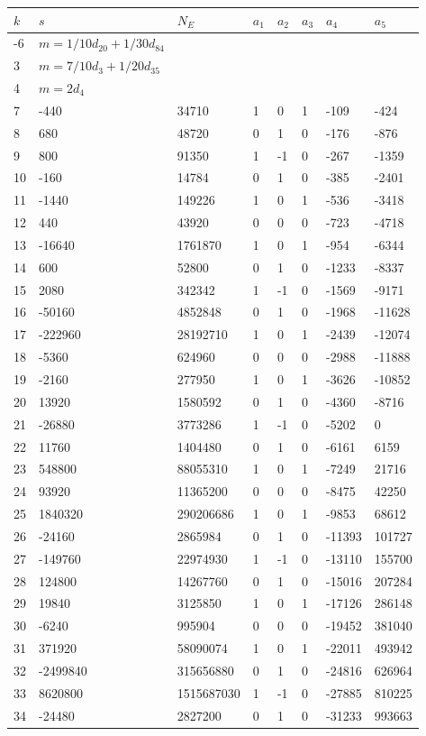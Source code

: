 \documentclass{amsart}
\begin{document}
\begin{longtable}{|l|l|l|lllll|}
\hline
$k$ & $s$ & $N_E$ & $a_1$ & $a_2$ & $a_3$ & $a_4$ & $a_5$\\
\hline
-6&$m=1/10d_{20}+1/30d_{84}$&&\multicolumn{5}{c|}{}\\
3&$m=7/10d_{3}+1/20d_{35}$&&\multicolumn{5}{c|}{}\\
4&$m=2d_{4}$&&\multicolumn{5}{c|}{}\\
7&-440&34710&1&0&1&-109&-424\\
8&680&48720&0&1&0&-176&-876\\
9&800&91350&1&-1&0&-267&-1359\\
10&-160&14784&0&1&0&-385&-2401\\
11&-1440&149226&1&0&1&-536&-3418\\
12&440&43920&0&0&0&-723&-4718\\
13&-16640&1761870&1&0&1&-954&-6344\\
14&600&52800&0&1&0&-1233&-8337\\
15&2080&342342&1&-1&0&-1569&-9171\\
16&-50160&4852848&0&1&0&-1968&-11628\\
17&-222960&28192710&1&0&1&-2439&-12074\\
18&-5360&624960&0&0&0&-2988&-11888\\
19&-2160&277950&1&0&1&-3626&-10852\\
20&13920&1580592&0&1&0&-4360&-8716\\
21&-26880&3773286&1&-1&0&-5202&0\\
22&11760&1404480&0&1&0&-6161&6159\\
23&548800&88055310&1&0&1&-7249&21716\\
24&93920&11365200&0&0&0&-8475&42250\\
25&1840320&290206686&1&0&1&-9853&68612\\
26&-24160&2865984&0&1&0&-11393&101727\\
27&-149760&22974930&1&-1&0&-13110&155700\\
28&124800&14267760&0&1&0&-15016&207284\\
29&19840&3125850&1&0&1&-17126&286148\\
30&-6240&995904&0&0&0&-19452&381040\\
31&371920&58090074&1&0&1&-22011&493942\\
32&-2499840&315656880&0&1&0&-24816&626964\\
33&8620800&1515687030&1&-1&0&-27885&810225\\
34&-24480&2827200&0&1&0&-31233&993663\\

\end{longtable}
\end{document}

